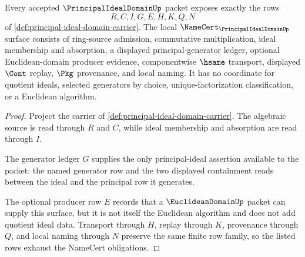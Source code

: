 \begin{theorem}
\label{thm:principal-ideal-domain-obligations}
Every accepted $\PrincipalIdealDomainUp$ packet exposes exactly the rows
$$
R,C,I,G,E,H,K,Q,N
$$
of \autoref{def:principal-ideal-domain-carrier}. The local $\NameCert_{\PrincipalIdealDomainUp}$ surface consists of ring-source admission, commutative multiplication, ideal membership and absorption, a displayed principal-generator ledger, optional Euclidean-domain producer evidence, componentwise $\hsame$ transport, displayed $\Cont$ replay, $\Pkg$ provenance, and local naming. It has no coordinate for quotient ideals, selected generators by choice, unique-factorization classification, or a Euclidean algorithm.
\end{theorem}
\begin{proof}
Project the carrier of \autoref{def:principal-ideal-domain-carrier}. The algebraic source is read through $R$ and $C$, while ideal membership and absorption are read through $I$.

The generator ledger $G$ supplies the only principal-ideal assertion available to the packet: the named generator row and the two displayed containment reads between the ideal and the principal row it generates.

The optional producer row $E$ records that a $\EuclideanDomainUp$ packet can supply this surface, but it is not itself the Euclidean algorithm and does not add quotient ideal data. Transport through $H$, replay through $K$, provenance through $Q$, and local naming through $N$ preserve the same finite row family, so the listed rows exhaust the NameCert obligations.
\end{proof}

